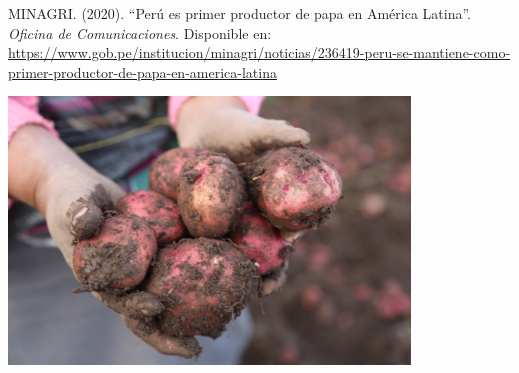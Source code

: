 \documentclass{article}
\begin{document}
\begin{thebibliography}{9}
MINAGRI. (2020). ``Perú es primer productor de papa en América Latina''. \\
\emph{Oficina de Comunicaciones}. Disponible en: \\
\url{https://www.gob.pe/institucion/minagri/noticias/236419-peru-se-mantiene-como-primer-productor-de-papa-en-america-latina}

\begin{center}
\includegraphics[width=0.8\textwidth]{la_papa.jpg}  
\end{center}

\end{thebibliography}
\end{document}

